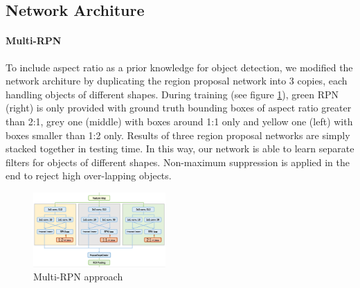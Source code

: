 \documentclass[10pt,twocolumn,letterpaper]{article}
\begin{document}
\subsection{Network Architure}
\paragraph{Multi-RPN}
To include aspect ratio as a prior knowledge for object detection, we modified the network architure by duplicating the region proposal network into 3 copies, each handling objects of different shapes. During training (see figure \ref{ARS_De}), green RPN (right) is only provided with ground truth bounding boxes of aspect ratio greater than 2:1, grey one (middle) with boxes around 1:1 only and yellow one (left) with boxes smaller than 1:2 only. Results of three region proposal networks are simply stacked together in testing time. In this way, our network is able to learn separate filters for objects of different shapes. Non-maximum suppression is applied in the end to reject high over-lapping objects. 
    \begin{figure}[!htb]
    \includegraphics[width= 0.45\textwidth]{pic/ARS-archi-detail.png}
    \caption{Multi-RPN approach}
    \label{ARS_De}
    \end{figure}
\end{document}
